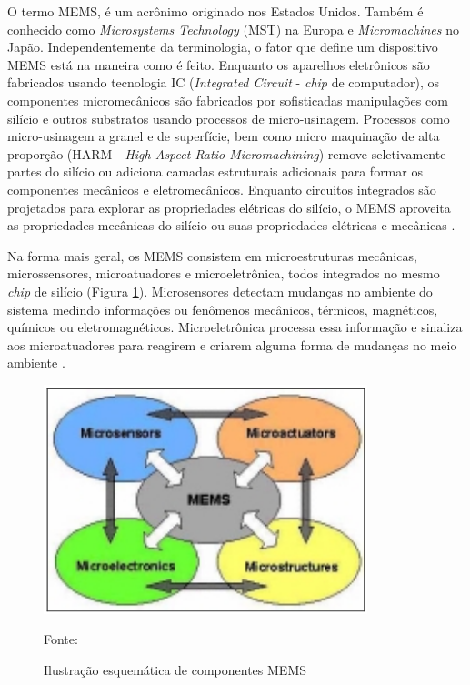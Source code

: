 		O termo MEMS, é um acrônimo originado nos Estados Unidos. Também é conhecido como \textit{Microsystems Technology} (MST) na Europa e \textit{Micromachines} no Japão. Independentemente da terminologia, o fator que define um dispositivo MEMS está na maneira como é feito. Enquanto os aparelhos eletrônicos são fabricados usando tecnologia IC (\textit{Integrated Circuit} - \textit{chip} de computador), os componentes micromecânicos são fabricados por sofisticadas manipulações com silício e outros substratos usando processos de micro-usinagem. Processos como micro-usinagem a granel e de superfície, bem como micro maquinação de alta proporção (HARM - \textit{High Aspect Ratio Micromachining}) remove seletivamente partes do silício ou adiciona camadas estruturais adicionais para formar os componentes mecânicos e eletromecânicos. Enquanto circuitos integrados são projetados para explorar as propriedades elétricas do silício, o MEMS aproveita as propriedades mecânicas do silício ou suas propriedades elétricas e mecânicas \cite{prime2002}.

		Na forma mais geral, os MEMS consistem em microestruturas mecânicas, microssensores, microatuadores e microeletrônica, todos integrados no mesmo \textit{chip} de silício (Figura \ref{esquematico_mems}). Microsensores detectam mudanças no ambiente do sistema medindo informações ou fenômenos mecânicos, térmicos, magnéticos, químicos ou eletromagnéticos. Microeletrônica processa essa informação e sinaliza aos microatuadores para reagirem e criarem alguma forma de mudanças no meio ambiente \cite{prime2002}.

		\begin{figure}[h]
			\centering
			\includegraphics[keepaspectratio=true,scale=0.5
			]{figuras/esquematico_mems.png}
			\caption{Ilustração esquemática de componentes MEMS}
			Fonte: \cite{prime2002}
			\label{esquematico_mems}
		\end{figure}

